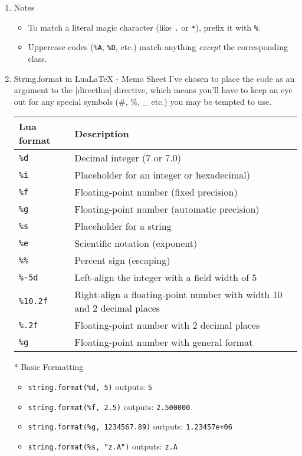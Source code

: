 \begin{enumerate}[label=(\alph*)]
\item Notes
\begin{itemize}
    \item To match a literal magic character (like \texttt{.} or \texttt{*}), prefix it with \texttt{\%}.
    \item Uppercase codes (\texttt{\%A}, \texttt{\%D}, etc.) match anything \emph{except} the corresponding class.
\end{itemize}

\item String.format in LuaLaTeX - Memo Sheet
I've chosen to place the code  as an argument to the |directlua| directive, which means you'll have to keep an eye out for any special symbols (\#, \%, \_ etc.) you may be tempted to use.

\begin{center}
  \begin{tabular}{@{}ll@{}}
  \toprule
  \textbf{Lua format}   & \textbf{Description} \\ \midrule
  \texttt{\%d}      & Decimal integer   (7 or 7.0)                           \\
  \texttt{\%i}      & Placeholder for an integer or hexadecimal)         \\
  \texttt{\%f}      & Floating-point number (fixed precision)      \\
  \texttt{\%g}      & Floating-point number (automatic precision)  \\
  \texttt{\%s}      & Placeholder for a string                            \\
  \texttt{\%e}      & Scientific notation (exponent)               \\
  \texttt{\%\%}     & Percent sign (escaping)                      \\
  \texttt{\%-5d}    & Left-align the integer with a field width of 5  \\
  \texttt{\%10.2f}  & Right-align a floating-point number with width 10 and 2 decimal places \\
  \texttt{\%.2f}    & Floating-point number with 2 decimal places  \\
  \texttt{\%g}      & Floating-point number with general format    \\ \bottomrule
  \end{tabular}
\end{center}


* Basic Formatting
\begin{itemize}
  \item \texttt{string.format(\%d, 5)} outputs: \texttt{5}
  \item \texttt{string.format(\%f, 2.5)} outputs: \texttt{2.500000}
  \item \texttt{string.format(\%g, 1234567.89)} outputs: \texttt{1.23457e+06}
  \item \texttt{string.format(\%s, "z.A")} outputs: \texttt{z.A}
\end{itemize}


\end{enumerate}

